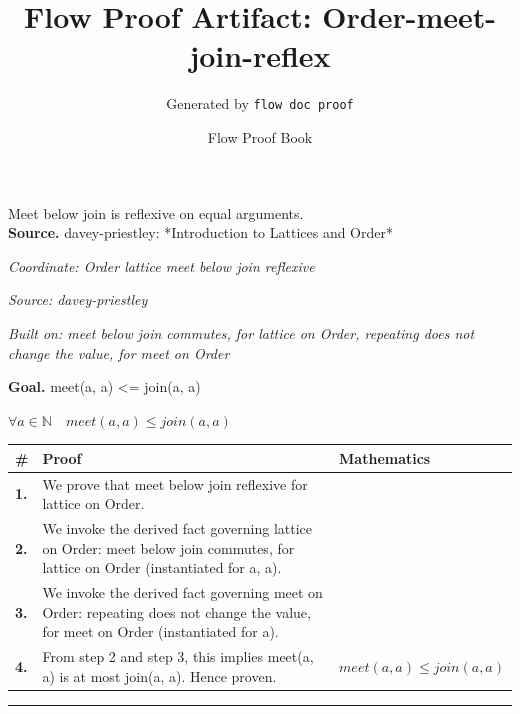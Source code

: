 \documentclass[11pt]{article}
\title{Flow Proof Artifact: Order-meet-join-reflex}
\author{Generated by \texttt{flow doc proof}}
\date{Flow Proof Book}
\theoremstyle{definition}
\begin{document}
\maketitle
Meet below join is reflexive on equal arguments.\\[0.5em]
\textbf{Source.} davey-priestley: *Introduction to Lattices and Order*\\[0.5em]
\bigskip
{}\par
\smallskip\noindent\textit{Coordinate: Order \cdot lattice \cdot meet below join reflexive}\par
\smallskip\noindent\textit{Source: davey-priestley}\par
\smallskip\noindent\textit{Built on: meet below join commutes, for lattice on Order, repeating does not change the value, for meet on Order}\par
\medskip
\noindent\textbf{Goal.} meet(a, a) <= join(a, a)\par
\noindent$\displaystyle \forall a \in \mathbb{N}\quad meet(a, a) \le join(a, a)$\par
\medskip
\noindent
\begin{tabular}{@{} >{\raggedright\arraybackslash}p{} >{\raggedright\arraybackslash}p{} >{\raggedleft\arraybackslash}p{} @{}}
\textbf{\#} & \textbf{Proof} & \textbf{Mathematics} \\
\midrule
\textbf{1.} & We prove that meet below join reflexive for lattice on Order. & \\[0.45em]
\textbf{2.} & We invoke the derived fact governing lattice on Order: meet below join commutes, for lattice on Order (instantiated for a, a). & \\[0.45em]
\textbf{3.} & We invoke the derived fact governing meet on Order: repeating does not change the value, for meet on Order (instantiated for a). & \\[0.45em]
\textbf{4.} & From step 2 and step 3, this implies meet(a, a) is at most join(a, a). Hence proven. & $\displaystyle meet(a, a) \le join(a, a)$ \\[0.45em]
\bottomrule
\end{tabular}
\label{thm:Order-lattice-meet_below_join_reflexive}
\par\medskip\hrule
\end{document}
